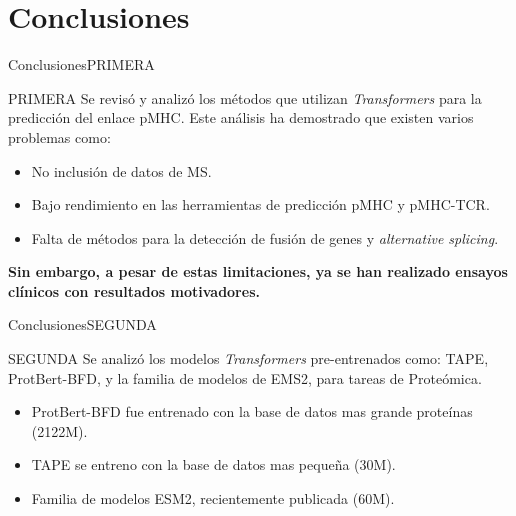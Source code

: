 \documentclass[10pt]{beamer}
\newcommand{\1}{
	\setbeamertemplate{background}{
		\texttt{[image: img/1]}
		\tikz[overlay] \fill[fill opacity=0.75,fill=white] (0,0) rectangle (-\paperwidth,\paperheight);
	}
}
\begin{document}
\section{Conclusiones}

\begin{frame}{Conclusiones}{PRIMERA}
	
	\begin{block}{PRIMERA}
		Se revisó y analizó los métodos que utilizan \textit{Transformers} para la predicción del enlace pMHC.  Este análisis ha demostrado que existen varios problemas como: 
		\pause
		\begin{itemize}
			\item No inclusión de datos de MS.\pause
			\item Bajo rendimiento en las herramientas de predicción pMHC y pMHC-TCR.\pause
			\item Falta de métodos para la detección de fusión de genes y \textit{alternative splicing}.
		\end{itemize}

	\pause
		\textbf{Sin embargo, a pesar de estas limitaciones, ya se han realizado ensayos clínicos con resultados motivadores.}
	\end{block}
	
	
\end{frame}

\begin{frame}{Conclusiones}{SEGUNDA}	
	\begin{block}{SEGUNDA}
		Se analizó los modelos \textit{Transformers} pre-entrenados como: TAPE, ProtBert-BFD, y la familia de modelos de EMS2, para tareas de Proteómica.
			\pause
		
		\begin{itemize}
			\item ProtBert-BFD fue entrenado con la base de datos mas grande proteínas (2122M). \pause
			\item TAPE se entreno con la base de datos mas pequeña (30M). \pause
			\item Familia de modelos ESM2, recientemente publicada (60M). 
		\end{itemize}	
	
	\end{block}	
\end{frame}
\end{document}
